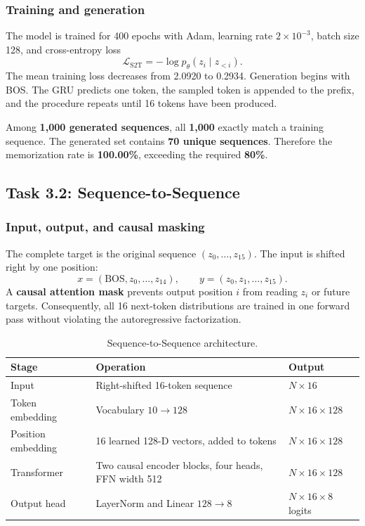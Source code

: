 \documentclass[11pt]{article}
\newcommand{\keydata}[1]{\textbf{#1}}
\newcommand{\keyarch}[1]{\textcolor{codeblue}{\textbf{#1}}}
\begin{document}
\subsubsection{Training and generation}

The model is trained for 400 epochs with Adam, learning rate $2\times10^{-3}$, batch size 128, and cross-entropy loss
\begin{equation}
 \mathcal{L}_{\mathrm{S2T}}=-\log p_\theta(z_i\mid z_{<i}).
\end{equation}
The mean training loss decreases from 2.0920 to 0.2934. Generation begins with BOS. The GRU predicts one token, the sampled token is appended to the prefix, and the procedure repeats until 16 tokens have been produced.

Among \keydata{1,000 generated sequences}, all \keydata{1,000} exactly match a training sequence. The generated set contains \keydata{70 unique sequences}. Therefore the memorization rate is \keydata{100.00\%}, exceeding the required \keydata{80\%}.

\subsection{Task 3.2: Sequence-to-Sequence}

\subsubsection{Input, output, and causal masking}

The complete target is the original sequence $(z_0,\ldots,z_{15})$. The input is shifted right by one position:
\begin{equation}
 x=(\mathrm{BOS},z_0,\ldots,z_{14}),\qquad
 y=(z_0,z_1,\ldots,z_{15}).
\end{equation}
A \keyarch{causal attention mask} prevents output position $i$ from reading $z_i$ or future targets. Consequently, all 16 next-token distributions are trained in one forward pass without violating the autoregressive factorization.

\begin{table}[H]
\centering
\caption{Sequence-to-Sequence architecture.}
\begin{tabularx}{\textwidth}{lXl}
\toprule
Stage & Operation & Output \\
\midrule
Input & Right-shifted 16-token sequence & $N\times16$ \\
Token embedding & Vocabulary $10\rightarrow128$ & $N\times16\times128$ \\
Position embedding & 16 learned 128-D vectors, added to tokens & $N\times16\times128$ \\
Transformer & Two causal encoder blocks, four heads, FFN width 512 & $N\times16\times128$ \\
Output head & LayerNorm and Linear $128\rightarrow8$ & $N\times16\times8$ logits \\
\bottomrule
\end{tabularx}
\end{table}
\end{document}
